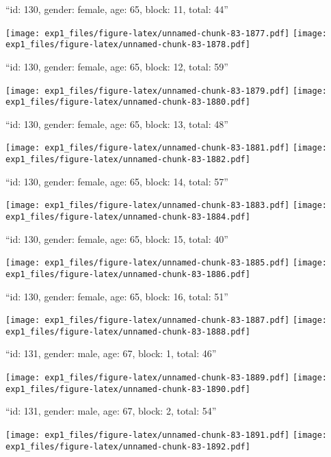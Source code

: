 \documentclass[11pt,,]{article}
\begin{document}
\newpage
[1] 

``id: 130, gender: female, age: 65, block: 11, total: 44''

\texttt{[image: exp1\_files/figure-latex/unnamed-chunk-83-1877.pdf]}
\texttt{[image: exp1\_files/figure-latex/unnamed-chunk-83-1878.pdf]}

\newpage
[1] 

``id: 130, gender: female, age: 65, block: 12, total: 59''

\texttt{[image: exp1\_files/figure-latex/unnamed-chunk-83-1879.pdf]}
\texttt{[image: exp1\_files/figure-latex/unnamed-chunk-83-1880.pdf]}

\newpage
[1] 

``id: 130, gender: female, age: 65, block: 13, total: 48''

\texttt{[image: exp1\_files/figure-latex/unnamed-chunk-83-1881.pdf]}
\texttt{[image: exp1\_files/figure-latex/unnamed-chunk-83-1882.pdf]}

\newpage
[1] 

``id: 130, gender: female, age: 65, block: 14, total: 57''

\texttt{[image: exp1\_files/figure-latex/unnamed-chunk-83-1883.pdf]}
\texttt{[image: exp1\_files/figure-latex/unnamed-chunk-83-1884.pdf]}

\newpage
[1] 

``id: 130, gender: female, age: 65, block: 15, total: 40''

\texttt{[image: exp1\_files/figure-latex/unnamed-chunk-83-1885.pdf]}
\texttt{[image: exp1\_files/figure-latex/unnamed-chunk-83-1886.pdf]}

\newpage
[1] 

``id: 130, gender: female, age: 65, block: 16, total: 51''

\texttt{[image: exp1\_files/figure-latex/unnamed-chunk-83-1887.pdf]}
\texttt{[image: exp1\_files/figure-latex/unnamed-chunk-83-1888.pdf]}

\newpage
[1] 

``id: 131, gender: male, age: 67, block: 1, total: 46''

\texttt{[image: exp1\_files/figure-latex/unnamed-chunk-83-1889.pdf]}
\texttt{[image: exp1\_files/figure-latex/unnamed-chunk-83-1890.pdf]}

\newpage
[1] 

``id: 131, gender: male, age: 67, block: 2, total: 54''

\texttt{[image: exp1\_files/figure-latex/unnamed-chunk-83-1891.pdf]}
\texttt{[image: exp1\_files/figure-latex/unnamed-chunk-83-1892.pdf]}
\end{document}
